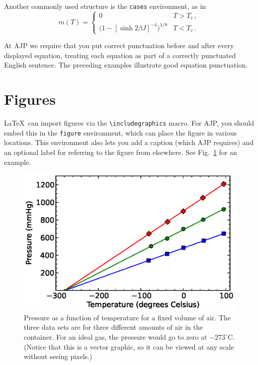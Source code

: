 \documentclass[prb,preprint]{revtex4-2}
\begin{document}
Another commonly used structure is the \texttt{cases} environment, as in
\begin{equation}
m(T) =
\begin{cases}
	0 & T > T_c \, , \\
	\bigl(1 - [\sinh 2 \beta J]^{-4} \bigr)^{1/8} & T < T_c \, .
\end{cases}
\end{equation}

At AJP we require that you put correct punctuation before and after every
displayed equation, treating each equation as part of a correctly punctuated
English sentence.\cite{mermin} The preceding examples illustrate good
equation punctuation.


\section{Figures}

\LaTeX\ can import figures via the \verb/\includegraphics/ macro.
For AJP, you should embed this in the \texttt{figure} environment, which 
can place the figure in various locations.  This environment also lets 
you add a caption (which AJP requires) and an optional label for referring 
to the figure from elsewhere.  See Fig.~\ref{gasbulbdata} for an example.

\begin{figure}[h!]
\centering
\includegraphics{GasBulbData.eps}
\caption{Pressure as a function of temperature for a fixed volume of air.  
The three data sets are for three different amounts of air in the container. 
For an ideal gas, the pressure would go to zero at $-273^\circ$C.  (Notice
that this is a vector graphic, so it can be viewed at any scale without
seeing pixels.)}
\label{gasbulbdata}
\end{figure}
\end{document}
